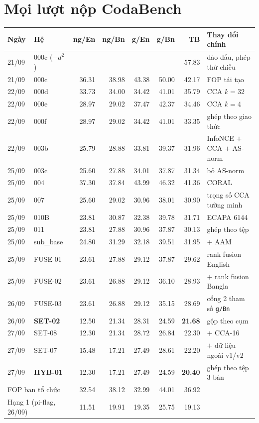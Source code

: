 \documentclass[11pt,a4paper,oneside]{report}
\newcommand{\id}[1]{\texttt{#1}}
\begin{document}
\section{Mọi lượt nộp CodaBench}
\begin{longtable}{llrrrrr>{\raggedright\arraybackslash}p{4.3cm}}
\toprule
Ngày & Hệ & ng/En & ng/Bn & g/En & g/Bn & \textbf{TB} & Thay đổi chính \\
\midrule\endhead
21/09 & 000c ($-d^2$) & & & & & 57.83 & đảo dấu, phép thử chiều \\
21/09 & 000c & 36.31 & 38.98 & 43.38 & 50.00 & 42.17 & FOP tái tạo \\
22/09 & 000d & 33.73 & 34.00 & 34.42 & 41.01 & 35.79 & CCA $k=32$ \\
22/09 & 000e & 28.97 & 29.02 & 37.47 & 42.37 & 34.46 & CCA $k=4$ \\
22/09 & 000f & 28.97 & 29.02 & 34.42 & 41.01 & 33.35 & ghép theo giao thức \\
22/09 & 003b & 25.79 & 28.88 & 33.81 & 39.37 & 31.96 & InfoNCE $+$ CCA $+$ AS-norm \\
25/09 & 003c & 25.60 & 27.88 & 34.01 & 37.87 & 31.34 & bỏ AS-norm \\
25/09 & 004 & 37.30 & 37.84 & 43.99 & 46.32 & 41.36 & CORAL \\
25/09 & 007 & 25.60 & 29.02 & 30.96 & 38.01 & 30.90 & trọng số CCA tường minh \\
25/09 & 010B & 23.81 & 30.87 & 32.38 & 39.78 & 31.71 & ECAPA 6144 \\
25/09 & 011 & 23.81 & 27.88 & 30.96 & 37.87 & 30.13 & ghép theo tệp \\
25/09 & sub\_base & 24.80 & 31.29 & 32.18 & 39.51 & 31.95 & 6144 $+$ AAM \\
25/09 & FUSE-01 & 23.61 & 27.88 & 29.12 & 37.87 & 29.62 & rank fusion English \\
25/09 & FUSE-02 & 23.61 & 26.88 & 29.12 & 36.10 & 28.93 & $+$ rank fusion Bangla \\
26/09 & FUSE-03 & 23.61 & 26.88 & 29.12 & 35.15 & 28.69 & cổng 2 tham số \id{g/Bn} \\
26/09 & \textbf{SET-02} & 12.50 & 21.34 & 28.31 & 24.59 & \textbf{21.68} & gộp theo cụm \\
27/09 & SET-08 & 12.30 & 21.34 & 28.72 & 26.84 & 22.30 & $+$ CCA-16 \\
27/09 & SET-07 & 15.48 & 17.21 & 27.49 & 28.61 & 22.20 & $+$ dữ liệu ngoài v1/v2 \\
27/09 & \textbf{HYB-01} & 12.30 & 17.21 & 27.49 & 24.59 & \textbf{20.40} & ghép theo tệp 3 bản \\
\midrule
\multicolumn{2}{l}{\color{muted}FOP ban tổ chức} & \color{muted}32.54 & \color{muted}38.12 & \color{muted}32.99 & \color{muted}44.01 & \color{muted}36.92 & \\
\multicolumn{2}{l}{\color{muted}Hạng 1 (pi-flag, 26/09)} & \color{muted}11.51 & \color{muted}19.91 & \color{muted}19.35 & \color{muted}25.75 & \color{muted}19.13 & \\
\bottomrule
\end{longtable}
\end{document}
